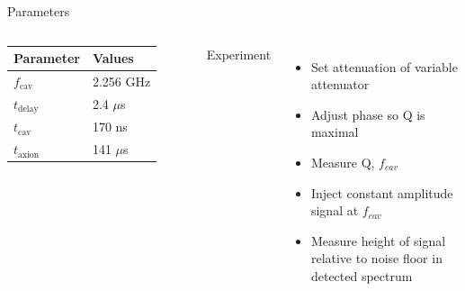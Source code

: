\documentclass{beamer}
\begin{document}
\begin{frame}{Parameters}
\begin{columns}
\begin{tabular}{| l l |}
\hline
Parameter & Values \\
\hline
\hline
$f_{\text{cav}}$ & 2.256 GHz \\ 
$t_{\text{delay}}$ & 2.4 $\mu$s \\
$t_{\text{cav}}$ & 170 ns \\ 
$t_{\text{axion}}$ & 141 $\mu$s \\
\hline
\end{tabular}
Experiment
\begin{itemize}
\item Set attenuation of variable attenuator
\item Adjust phase so Q is maximal
\item Measure Q, $f_{cav}$
\item Inject constant amplitude signal at $f_{cav}$
\item Measure height of signal relative to noise floor in detected spectrum
\end{itemize}
\end{columns}
\end{frame}

%
%
%


%

\end{document}
